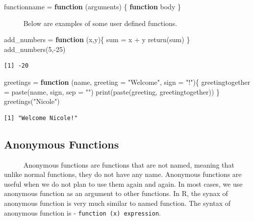 \documentclass[
  letterpaper,
  DIV=11,
  numbers=noendperiod]{scrreprt}
\newenvironment{Shaded}{\begin{snugshade}}{\end{snugshade}}
\newcommand{\AttributeTok}[1]{\textcolor[rgb]{0.40,0.45,0.13}{#1}}
\newcommand{\ControlFlowTok}[1]{\textcolor[rgb]{0.00,0.23,0.31}{\textbf{#1}}}
\newcommand{\DecValTok}[1]{\textcolor[rgb]{0.68,0.00,0.00}{#1}}
\newcommand{\FunctionTok}[1]{\textcolor[rgb]{0.28,0.35,0.67}{#1}}
\newcommand{\NormalTok}[1]{\textcolor[rgb]{0.00,0.23,0.31}{#1}}
\newcommand{\OtherTok}[1]{\textcolor[rgb]{0.00,0.23,0.31}{#1}}
\newcommand{\SpecialCharTok}[1]{\textcolor[rgb]{0.37,0.37,0.37}{#1}}
\newcommand{\StringTok}[1]{\textcolor[rgb]{0.13,0.47,0.30}{#1}}
\begin{document}
\begin{Shaded}
\begin{Highlighting}[]
\NormalTok{functionname }\OtherTok{=} \ControlFlowTok{function}\NormalTok{ (arguments) \{}
    \ControlFlowTok{function}\NormalTok{ body }
\NormalTok{\}}
\end{Highlighting}
\end{Shaded}

~~~~~ Below are examples of some user defined functions.

\begin{Shaded}
\begin{Highlighting}[]
\NormalTok{add\_numbers }\OtherTok{=} \ControlFlowTok{function}\NormalTok{ (x,y)\{}
\NormalTok{    sum }\OtherTok{=}\NormalTok{ x }\SpecialCharTok{+}\NormalTok{ y }
    \FunctionTok{return}\NormalTok{(sum)}
\NormalTok{\}}
\FunctionTok{add\_numbers}\NormalTok{(}\DecValTok{5}\NormalTok{,}\SpecialCharTok{{-}}\DecValTok{25}\NormalTok{)}
\end{Highlighting}
\end{Shaded}

\begin{verbatim}
[1] -20
\end{verbatim}

\begin{Shaded}
\begin{Highlighting}[]
\NormalTok{greetings }\OtherTok{=} \ControlFlowTok{function}\NormalTok{ (name, }\AttributeTok{greeting =} \StringTok{"Welcome"}\NormalTok{, }\AttributeTok{sign =} \StringTok{"!"}\NormalTok{)\{}
\NormalTok{    greetingtogether }\OtherTok{=} \FunctionTok{paste}\NormalTok{(name, sign, }\AttributeTok{sep =} \StringTok{""}\NormalTok{)}
    \FunctionTok{print}\NormalTok{(}\FunctionTok{paste}\NormalTok{(greeting, greetingtogether))}
\NormalTok{\}}
\FunctionTok{greetings}\NormalTok{(}\StringTok{"Nicole"}\NormalTok{)}
\end{Highlighting}
\end{Shaded}

\begin{verbatim}
[1] "Welcome Nicole!"
\end{verbatim}

\subsection{Anonymous Functions}\label{anonymous-functions}

~~~~~ Anonymous functions are functions that are not named, meaning that
unlike normal functions, they do not have any name. Anonymous functions
are useful when we do not plan to use them again and again. In most
cases, we use anonymous function as an argument to other functions. In
R, the synax of anonymous function is very much similar to named
function. The syntax of anonymous function is -
\texttt{function\ (x)\ expression}.
\end{document}
